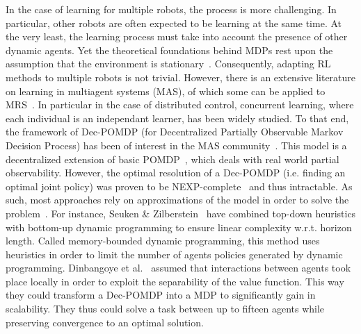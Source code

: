     In the case of learning for multiple robots, the process is more challenging. In particular, other robots are often expected to be learning at the same time. At the very least, the learning process must take into account the presence of other dynamic agents. Yet the theoretical foundations behind MDPs rest upon the assumption that the environment is stationary~\parencite{Littman1994, Parker2008}. Consequently, adapting RL methods to multiple robots is not trivial. However, there is an extensive literature on learning in multiagent systems (MAS), of which some can be applied to MRS~\parencite{Stone2000, Yang2005, Panait2005}. In particular in the case of distributed control, concurrent learning, where each individual is an independant learner, has been widely studied. To that end, the framework of Dec-POMDP (for Decentralized Partially Observable Markov Decision Process) has been of interest in the MAS community~\parencite{Bernstein2002, Amato2013}. This model is a decentralized extension of basic POMDP~\parencite{Astrom1965}, which deals with real world partial observability. However, the optimal resolution of a Dec-POMDP (i.e. finding an optimal joint policy) was proven to be NEXP-complete~\parencite{Bernstein2002} and thus intractable. As such, most approaches rely on approximations of the model in order to solve the problem~\parencite{Beynier2011, Amato2013}. For instance, Seuken \& Zilberstein~\parencite{Seuken2007} have combined top-down heuristics with bottom-up dynamic programming to ensure linear complexity w.r.t. horizon length. Called memory-bounded dynamic programming, this method uses heuristics in order to limit the number of agents policies generated by dynamic programming. Dinbangoye et al.~\parencite{Dibangoye2015} assumed that interactions between agents took place locally in order to exploit the separability of the value function. This way they could transform a Dec-POMDP into a MDP to significantly gain in scalability. They thus could solve a task between up to fifteen agents while preserving convergence to an optimal solution.


